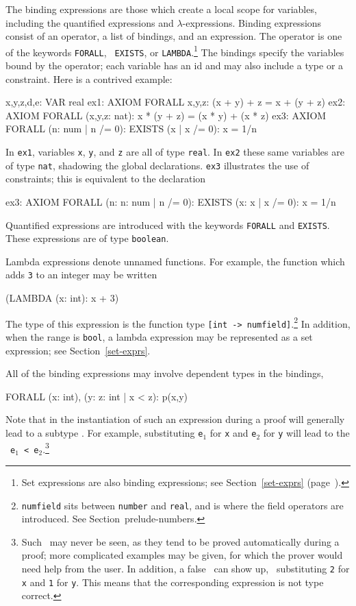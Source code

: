 The binding expressions are those which create a local scope for
variables, including the quantified expressions and
$\lambda$-expressions.  Binding expressions consist of an operator, a
list of bindings, and an expression.  The operator is one of the
keywords \texttt{FORALL}, \texttt{
EXISTS}, or \texttt{LAMBDA}.\footnote{Set
expressions are also binding expressions; see Section~\ref{set-exprs} (page~\pageref{set-exprs}).}
The bindings specify the variables bound by the operator; each variable
has an id and may also include a type or a constraint.  Here is a
contrived example:
\begin{pvsex}
  x,y,z,d,e: VAR real
  ex1: AXIOM FORALL x,y,z: (x + y) + z = x + (y + z)
  ex2: AXIOM FORALL (x,y,z: nat): x * (y + z) = (x * y) + (x * z)
  ex3: AXIOM FORALL (n: num | n /= 0): EXISTS (x | x /= 0): x = 1/n
\end{pvsex}
%
In \texttt{ex1}, variables \texttt{x}, \texttt{y}, and \texttt{z} are all of type
\texttt{real}.  In \texttt{ex2} these same variables are of type \texttt{nat},
shadowing the global declarations.  \texttt{ex3} illustrates
the use of constraints; this is equivalent to the declaration
\begin{pvsex}
  ex3: AXIOM FORALL (n: \setb{}n: num | n /= 0\sete):
               EXISTS (x: \setb{}x | x /= 0\sete): x = 1/n
\end{pvsex}

Quantified expressions are introduced with
the keywords \texttt{FORALL} and \texttt{EXISTS}.  These expressions are
of type \texttt{boolean}.

Lambda expressions denote unnamed functions.
For example, the function which adds \texttt{3} to an integer may be
written
\begin{pvsex}
  (LAMBDA (x: int): x + 3)
\end{pvsex}
%
The type of this expression is the function type \texttt{[int ->
numfield]}.\footnote{\texttt{numfield} sits between \texttt{number} and
\texttt{real}, and is where the field operators are introduced.  See
Section~{prelude-numbers}.}  In addition, when the range is \texttt{bool},
a lambda expression may be represented as a set expression; see
Section~\ref{set-exprs}.

All of the binding expressions may involve dependent
types in the bindings, \eg
\begin{pvsex}
  FORALL (x: int), (y: \setb{}z: int | x < z\sete): p(x,y)
\end{pvsex}
%
Note that in the instantiation of such an expression during a proof will
generally lead to a subtype \tcc.  For example, substituting \texttt{e$_1$} for
\texttt{x} and \texttt{e$_2$} for \texttt{y} will lead to the \tcc\ \texttt{e$_1$ <
e$_2$}.\footnote{Such \tccs\ may never be seen, as they tend to be
proved automatically during a proof; more complicated examples may be
given, for which the prover would need help from the user.  In addition,
a false \tcc\ can show up, \eg\ substituting \texttt{2} for \texttt{x} and
\texttt{1} for \texttt{y}.  This means that the corresponding expression is
not type correct.}

